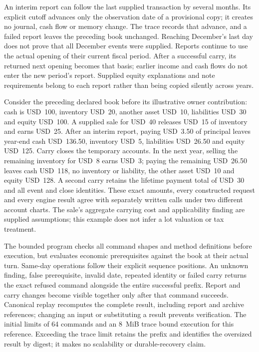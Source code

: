 An interim report can follow the last supplied transaction by several months.
Its explicit cutoff advances only the observation date of a provisional copy;
it creates no journal, cash flow or memory change. The trace records that advance,
and a failed report leaves the preceding book unchanged. Reaching December's
last day does not prove that all December events were supplied. Reports continue
to use the actual opening of their current fiscal period. After a successful
carry, its returned next opening becomes that basis; earlier income and cash
flows do not enter the new period's report. Supplied equity explanations and note
requirements belong to each report rather than being copied silently across years.

Consider the preceding declared book before its illustrative owner contribution:
cash is USD~100, inventory USD~20, another asset USD~10, liabilities USD~30 and
equity USD~100. A supplied sale for USD~40 releases USD~15 of inventory and earns
USD~25. After an interim report, paying USD~3.50 of principal leaves year-end cash
USD~136.50, inventory USD~5, liabilities USD~26.50 and equity USD~125. Carry closes
the temporary accounts. In the next year, selling the remaining inventory for
USD~8 earns USD~3; paying the remaining USD~26.50 leaves cash USD~118, no inventory
or liability, the other asset USD~10 and equity USD~128. A second carry retains the
lifetime payment total of USD~30 and all event and close identities. These exact
amounts, every constructed request and every engine result agree with separately
written calls under two different account charts. The sale's aggregate carrying
cost and applicability finding are supplied assumptions; this example does not
infer a lot valuation or tax treatment.

The bounded program checks all command shapes and method definitions before
execution, but evaluates economic prerequisites against the book at their actual
turn. Same-day operations follow their explicit sequence positions. An unknown
finding, false prerequisite, invalid date, repeated identity or failed carry
returns the exact refused command alongside the entire successful prefix. Report
and carry changes become visible together only after that command succeeds.
Canonical replay recomputes the complete result, including report and archive
references; changing an input or substituting a result prevents verification.
The initial limits of 64 commands and an 8~MiB trace bound execution for this
reference. Exceeding the trace limit retains the prefix and identifies the
oversized result by digest; it makes no scalability or durable-recovery claim.


